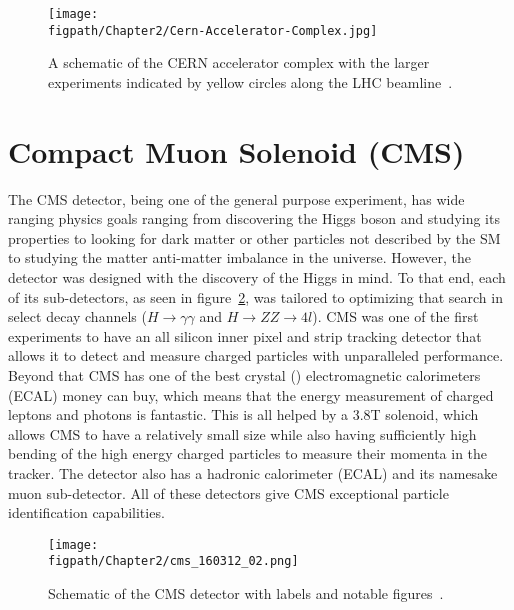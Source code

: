 \begin{figure}[!hbt]
	\centering
	\texttt{[image: \\figpath/Chapter2/Cern-Accelerator-Complex.jpg]}
	\caption{A schematic of the CERN accelerator complex with the larger experiments indicated by yellow circles along the LHC beamline~\cite{Marcastel:1621583}.}
	\label{fig:CERN_accelerator_complex}
\end{figure}

\section{Compact Muon Solenoid (CMS)}

The CMS detector, being one of the general purpose experiment, has wide ranging physics goals ranging from discovering the Higgs boson and studying its properties to looking for dark matter or other particles not described by the SM to studying the matter anti-matter imbalance in the universe.
However, the detector was designed with the discovery of the Higgs in mind.
To that end, each of its sub-detectors, as seen in figure~\ref{fig:CMS_schematic}, was tailored to optimizing that search in select decay channels ($H\rightarrow\gamma\gamma$ and $H\rightarrow{ZZ}\rightarrow{4l}$).
CMS was one of the first experiments to have an all silicon inner pixel and strip tracking detector that allows it to detect and measure charged particles with unparalleled performance.
Beyond that CMS has one of the best crystal (\PbWO) electromagnetic calorimeters (ECAL) money can buy, which means that the energy measurement of charged leptons and photons is fantastic.
This is all helped by a 3.8\unit{T} solenoid, which allows CMS to have a relatively small size while also having sufficiently high bending of the high energy charged particles to measure their momenta in the tracker.
The detector also has a hadronic calorimeter (ECAL) and its namesake muon sub-detector.
All of these detectors give CMS exceptional particle identification capabilities.

\begin{figure}[!hbt]
	\centering
	\texttt{[image: \\figpath/Chapter2/cms\_160312\_02.png]}
	\caption{Schematic of the CMS detector with labels and notable figures~\cite{SketchUpCMS}.}
	\label{fig:CMS_schematic}
\end{figure}


